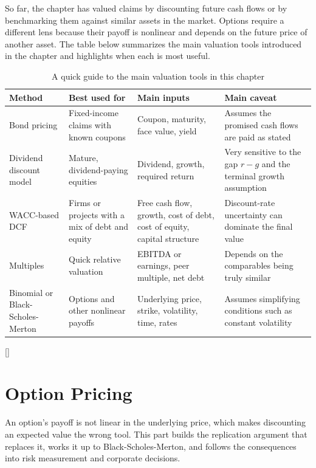 \documentclass[../ai_in_finance]{subfiles}
\begin{document}
So far, the chapter has valued claims by discounting future cash flows or by benchmarking them against similar assets in the market. Options require a different lens because their payoff is nonlinear and depends on the future price of another asset. The table below summarizes the main valuation tools introduced in the chapter and highlights when each is most useful.

\begin{table}[htbp]
\centering
\begin{lrbox}{\bookmeasuredbox}
\begin{tabular}{p{2.6cm}p{3.4cm}p{3.4cm}p{3.4cm}}
\toprule
Method & Best used for & Main inputs & Main caveat \\
\midrule
Bond pricing & Fixed-income claims with known coupons & Coupon, maturity, face value, yield & Assumes the promised cash flows are paid as stated \\
Dividend discount model & Mature, dividend-paying equities & Dividend, growth, required return & Very sensitive to the gap $r-g$ and the terminal growth assumption \\
WACC-based DCF & Firms or projects with a mix of debt and equity & Free cash flow, growth, cost of debt, cost of equity, capital structure & Discount-rate uncertainty can dominate the final value \\
Multiples & Quick relative valuation & EBITDA or earnings, peer multiple, net debt & Depends on the comparables being truly similar \\
Binomial or Black-Scholes-Merton & Options and other nonlinear payoffs & Underlying price, strike, volatility, time, rates & Assumes simplifying conditions such as constant volatility \\
\bottomrule
\end{tabular}
\end{lrbox}
\ifdim\wd\bookmeasuredbox<0.65\linewidth
\setlength{\bookcapwidth}{0.65\linewidth}
\else
\setlength{\bookcapwidth}{\wd\bookmeasuredbox}
\fi
{}[\bookcapwidth]{
\usebox{\bookmeasuredbox}
}{
\caption{A quick guide to the main valuation tools in this chapter}
\label{tab:valuation_methods}
}
\end{table}

\section{Option Pricing}

An option's payoff is not linear in the underlying price, which makes discounting an expected value the wrong tool. This part builds the replication argument that replaces it, works it up to Black-Scholes-Merton, and follows the consequences into risk measurement and corporate decisions.
\end{document}
